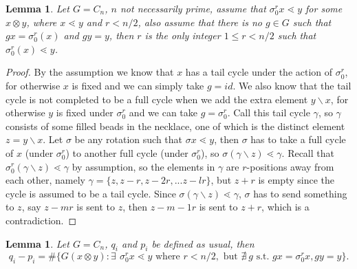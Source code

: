 \documentclass{amsart}
\newtheorem{lem}[thm]{Lemma}
\theoremstyle{remark}
\newcommand{\minus}{\backslash}
\begin{document}
\begin{lem}{\label{lem:cyclic_bound_r}}
Let $G = C_n$, $n$ not necessarily prime, assume that $\sigma_0^r x \lessdot y$ for some $x \otimes y$, where $x \lessdot y$ and $r < n/2$, also assume that there is no $g \in G$ such that $g x = \sigma_0^r (x)$ and $gy = y$, then $r$ is the only integer $1 \le r < n/2$ such that $\sigma_0^r (x) \lessdot y$. 
\end{lem}

\begin{proof}

By the assumption we know that $x$ has a tail cycle under the action of $\sigma_0^{r}$, for otherwise $x$ is fixed and we can simply take $g = id$. We also know that the tail cycle is not completed to be a full cycle when we add the extra element $y \minus x$, for otherwise $y$ is fixed under $\sigma_0^r$  and we can take $g = \sigma_0^r$.  Call this tail cycle $\gamma$, so $\gamma$ consists of some filled beads in the necklace, one of which is the distinct element $z = y \minus x$. Let $\sigma$ be any rotation such that $\sigma x \lessdot y$, then $\sigma$ has to take a full cycle of $x$ (under $\sigma_0^r$) to another full cycle (under $\sigma_0^r$), so $\sigma (\gamma \minus z) \lessdot \gamma$. Recall that $\sigma_0^r (\gamma \minus z) \lessdot \gamma$ by assumption, so the elements in $\gamma$ are $r$-positions away from each other, namely $\gamma = \{ z, z-r, z-2r, ... z -l r\}$, but $z+r$ is empty since the cycle is assumed to be a tail cycle. Since $\sigma (\gamma \minus z) \lessdot \gamma$, $\sigma$ has to send something to $z$, say $z - m r$ is sent to $z$, then $z - {m-1}r$ is sent to $z+r$, which is a contradiction. 
\end{proof}

\begin{lem}{\label{lem:cyclic_counting_difference}} 
Let $G= C_n$, $q_i$ and $p_i$ be defined as usual, 
then $$q_i - p_i = \#\{G{(x \otimes y)} : \exists \: \, \sigma_0^r x \lessdot y \text{ where } r < n/2, \text{ but } \nexists \:  g \text{ s.t. } g x = \sigma_0 ^r x, g y = y \}.$$
\end{lem}
\end{document}
